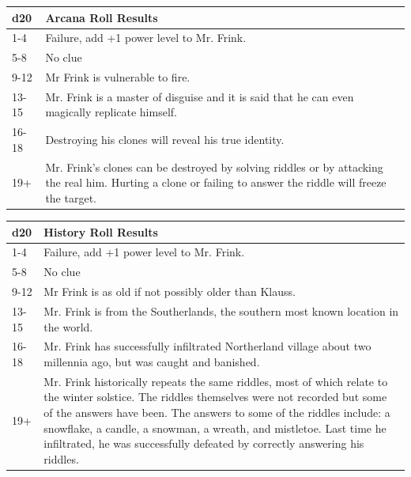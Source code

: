 \documentclass{article}
\begin{document}
\begin{multicols*}{2}
	\begin{table}[H]
		\begin{tabular}{|m{2.5em}|m{20em}|}
			\hline
			\textbf{d20} & \textbf{Arcana Roll Results} \\
			\hline
			\hline
			1-4 & Failure, add +1 power level to Mr. Frink. \\
			\hline
			5-8 & No clue  \\
			\hline
			9-12 & Mr Frink is vulnerable to fire. \\
			\hline
			13-15 & Mr. Frink is a master of disguise and it is said that he can even magically replicate himself. \\ 
			\hline
			16-18 &  Destroying his clones will reveal his true identity. \\
			\hline
			19+ & Mr. Frink's clones can be destroyed by solving riddles or by attacking the real him. Hurting a clone or failing to answer the riddle will freeze the target. \\
			\hline
		\end{tabular}
	\end{table}

	\begin{table}[H]
		\begin{tabular}{|m{2.5em}|m{20em}|}
			\hline
			\textbf{d20} & \textbf{History Roll Results} \\
			\hline
			\hline
			1-4 & Failure, add +1 power level to Mr. Frink. \\
			\hline
			5-8 & No clue  \\
			\hline
			9-12 & Mr Frink is as old if not possibly older than Klauss. \\
			\hline
			13-15 & Mr. Frink is from the Southerlands, the southern most known location in the world. \\ 
			\hline
			16-18 & Mr. Frink has successfully infiltrated Northerland village about two millennia ago, but was caught and banished. \\
			\hline
			19+ & Mr. Frink historically repeats the same riddles, most of which relate to the winter solstice. The riddles themselves were not recorded but some of the answers have been. The answers to some of the riddles include: a snowflake, a candle, a snowman, a wreath, and mistletoe. Last time he infiltrated, he was successfully defeated by correctly answering his riddles. \\
			\hline
		\end{tabular}
	\end{table}


\end{multicols*}
\end{document}
